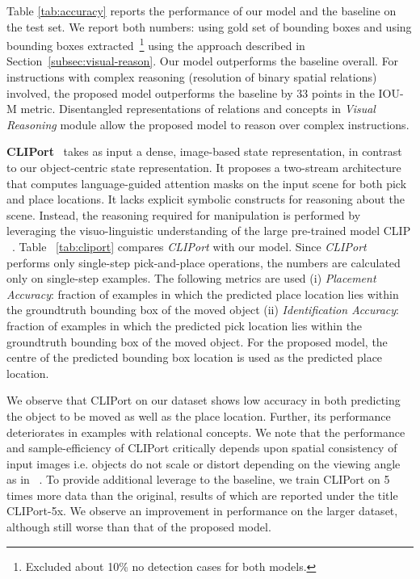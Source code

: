 Table \ref{tab:accuracy} reports the performance of our model and the baseline on the test set. We report both numbers: using gold set of bounding boxes and using bounding boxes extracted~\footnote{Excluded about 10\% no detection cases for both models.} using the approach described in Section~\ref{subsec:visual-reason}. Our model outperforms the baseline overall. For instructions with complex reasoning (resolution of binary spatial relations) involved, the proposed model outperforms the baseline by $33$ points in the IOU-M metric.
%
Disentangled representations of relations and concepts in \textit{Visual Reasoning} module allow the proposed model to reason over complex instructions.

\textbf{CLIPort}~\cite{shridhar2022cliport} takes as input a dense, image-based state representation, in contrast to our object-centric state representation. It proposes a two-stream architecture that computes language-guided attention masks on the input scene for both pick and place locations. It lacks explicit symbolic constructs for reasoning about the scene. Instead, the reasoning required for manipulation is performed by leveraging the visuo-linguistic understanding of the large pre-trained model CLIP ~\cite{clip}. Table ~\ref{tab:cliport} compares \emph{CLIPort} with our model. Since \emph{CLIPort} performs only single-step pick-and-place operations, the numbers are calculated only on single-step examples. The following metrics are used (i) \emph{Placement Accuracy}: fraction of examples in which the predicted place location lies within the groundtruth bounding box of the moved object (ii) \emph{Identification Accuracy}: fraction of examples in which the predicted pick location lies within the groundtruth bounding box of the moved object. For the proposed model, the centre of the predicted bounding box location is used as the predicted place location.

We observe that CLIPort on our dataset shows low accuracy in both predicting the object to be moved as well as the place location. Further, its performance deteriorates in examples with relational concepts. We note that the performance and sample-efficiency of CLIPort critically depends upon  spatial consistency of input images i.e. objects do not scale or distort depending on the viewing angle as in ~\cite{shridhar2022cliport}. To provide additional leverage to the baseline, we train CLIPort on 5 times more data than the original, results of which are reported under the title CLIPort-5x. We observe an improvement in performance on the larger dataset, although still worse than that of the proposed model. 


